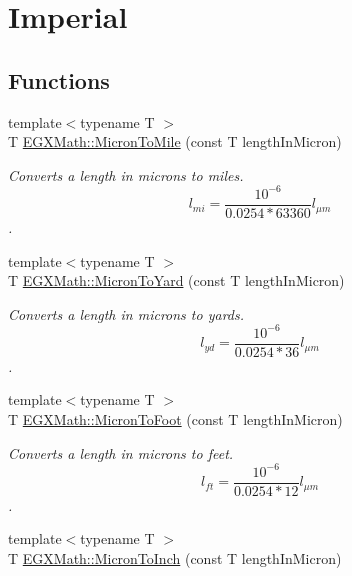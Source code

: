 \hypertarget{group___e_g_x_math-_conversions-_length_conversions-_non-_s_i-_micron-_imperial}{}\section{Imperial}
\label{group___e_g_x_math-_conversions-_length_conversions-_non-_s_i-_micron-_imperial}
\subsection*{Functions}
\begin{DoxyCompactItemize}
\item 
{\footnotesize template$<$typename T $>$ }\\T \mbox{\hyperlink{group___e_g_x_math-_conversions-_length_conversions-_non-_s_i-_micron-_imperial_ga4a6e2d3df67af4008be36f3899c1ca19}{E\+G\+X\+Math\+::\+Micron\+To\+Mile}} (const T length\+In\+Micron)
\begin{DoxyCompactList}\small\item\em Converts a length in microns to miles. \[ l_{mi}=\frac{10^{-6}}{0.0254 * 63360} l_{\mu m} \]. \end{DoxyCompactList}\item 
{\footnotesize template$<$typename T $>$ }\\T \mbox{\hyperlink{group___e_g_x_math-_conversions-_length_conversions-_non-_s_i-_micron-_imperial_gae986c2e4dc5b38e249a8ec2fa2a3a0ea}{E\+G\+X\+Math\+::\+Micron\+To\+Yard}} (const T length\+In\+Micron)
\begin{DoxyCompactList}\small\item\em Converts a length in microns to yards. \[ l_{yd}= \frac{10^{-6}}{0.0254 * 36} l_{\mu m} \]. \end{DoxyCompactList}\item 
{\footnotesize template$<$typename T $>$ }\\T \mbox{\hyperlink{group___e_g_x_math-_conversions-_length_conversions-_non-_s_i-_micron-_imperial_gab90a87773543173f5b774b6ccb646b5f}{E\+G\+X\+Math\+::\+Micron\+To\+Foot}} (const T length\+In\+Micron)
\begin{DoxyCompactList}\small\item\em Converts a length in microns to feet. \[ l_{ft}= \frac{10^{-6}}{0.0254 * 12} l_{\mu m} \]. \end{DoxyCompactList}\item 
{\footnotesize template$<$typename T $>$ }\\T \mbox{\hyperlink{group___e_g_x_math-_conversions-_length_conversions-_non-_s_i-_micron-_imperial_ga12a0ceda3109e1f972dd62a797c78503}{E\+G\+X\+Math\+::\+Micron\+To\+Inch}} (const T length\+In\+Micron)

\end{DoxyCompactItemize}
